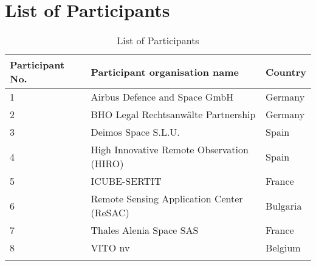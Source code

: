 \chapter{List of Participants}

\begin{longtable}[H]{l p{9cm} p{2cm}}
	
	\toprule[2pt]
	
	\textbf{Participant No.} & \textbf{Participant organisation name} & \textbf{Country} \\
	
	\midrule[1.5pt] 
	\endhead
	
	1 & Airbus Defence and Space GmbH & Germany \vspace{0.2cm} \\
	
	\midrule

	2 & BHO Legal Rechtsanwälte Partnership & Germany \vspace{0.2cm} \\
	
	\midrule
	
	3 &  Deimos Space S.L.U. & Spain \vspace{0.2cm} \\

	\midrule

 	4 & High Innovative Remote Observation (HIRO) & Spain \vspace{0.2cm} \\
 	
 	\midrule
 	
 	5 & ICUBE-SERTIT & France \vspace{0.2cm} \\
 	
 	\midrule
 	
 	6 & Remote Sensing Application Center (ReSAC) & Bulgaria \vspace{0.2cm} \\
 	
 	\midrule
 	
 	7 & Thales Alenia Space SAS & France \vspace{0.2cm} \\
 	
 	\midrule
 	
 	8 & VITO nv & Belgium \vspace{0.2cm} \\
	
	\bottomrule[2pt]
	
	\caption{List of Participants}
	\label{Participants}
\end{longtable}
